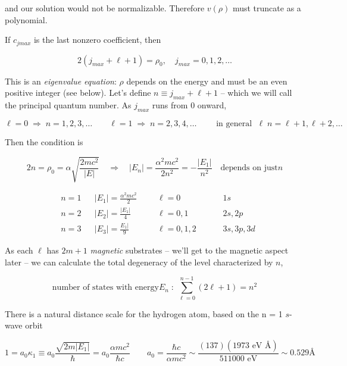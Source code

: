 and our solution would not be normalizable. Therefore $v(\rho)$ must truncate
as a polynomial. 

If $c_{jmax}$ is the last nonzero coefficient, then 

\[
  2(j_{max} + \ell +1) = \rho_0, \quad j_{max} = 0, 1, 2, \hdots
\] \vspace{3px}

This is an \textit{eigenvalue equation}: $\rho$ depends on the energy and must
be an even positive integer (see below). Let's define $n \equiv j_{max} +  \ell
+1$ -- which we will call the principal quantum number. As $j_{max} $ runs from
0 onward, 

\[
\ell =0 \; \Rightarrow \; n = 1,2,3,\hdots \qquad \ell =1 \; \Rightarrow \;
n = 2,3,4,\hdots \qquad \text{ in general } \; \ell \; n = \ell + 1, \ell +2,
\hdots
\] \vspace{3px}


Then the condition is 

\[
2n = \rho_0 = \alpha \sqrt{\frac{2mc^2}{|E|}} \quad \Rightarrow \quad |E_n|
= \frac{\alpha^2 mc^2}{2n^2} = -\frac{|E_1|}{n^2} \quad \text{depends on just}
n
\] \vspace{3px}

\begin{subbox}{}
  \begin{align} \label{}
    &n = 1 &&|E_1| = \frac{\alpha^2mc^2}{2} &&&\ell =0 &&&& 1s \\ 
    &n = 2 &&|E_2| = \frac{|E_1|}{4} &&&\ell = 0, 1 &&&& 2s, 2p \\
    &n = 3 &&|E_3| = \frac{E_1|}{9} &&&\ell = 0, 1, 2 &&&& 3s, 3p, 3d
  \end{align}\vspace{3px}
\end{subbox}




As each $\ell $ has $2m+1$ \textit{magnetic} substrates -- we'll get to the
magnetic aspect later -- we can calculate the total degeneracy of the level
characterized by $ n$, 

\[
\text{number of states with energy} E_n \; : \; \sum_{\ell =0}^{n-1} (2\ell +1)
= n^2
\] \vspace{3px}

There is a natural distance scale for the hydrogen atom, based on the
n = 1 $s$-wave orbit 

\[
1 = a_0\kappa_1 \equiv a_0 \frac{\sqrt{2m|E_1|}}{\hbar} = a_0 \frac{\alpha
  mc^2}{\hbar c} \qquad a_0 = \frac{\hbar c}{\alpha mc^2} \sim \frac{(137)
(1973 \text{ eV \AA} ) }{511000 \text{ eV} } \sim 0.529 \text{\AA} 
\] \vspace{3px}

